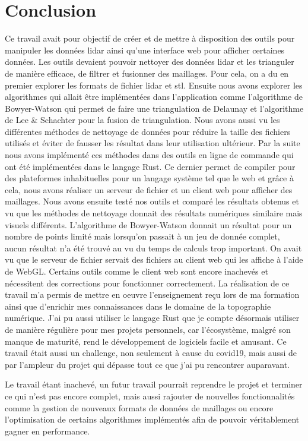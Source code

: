\chapter*{Conclusion}

Ce travail avait pour objectif de créer et de mettre à disposition des outils pour manipuler les données \gls{lidar} ainsi qu'une interface web pour afficher certaines données.
Les outils devaient pouvoir nettoyer des données \gls{lidar} et les trianguler de manière efficace, de filtrer et fusionner des maillages.
Pour cela, on a du en premier explorer les formats de fichier \gls{lidar} et
\gls{stl}.
Ensuite nous avons explorer les algorithmes qui allait être implémentées dans
l'application comme l'algorithme de Bowyer-Watson qui permet de faire une
triangulation de Delaunay et l'algorithme de Lee \& Schachter pour la fusion de
triangulation. Nous avons aussi vu les différentes méthodes de nettoyage de
données pour réduire la taille des fichiers utilisés et éviter de fausser les
résultat dans leur utilisation ultérieur. Par la suite nous avons implémenté ces
méthodes dans des outils en ligne de commande qui ont été implémentées dans le langage Rust.
Ce dernier permet de compiler pour des plateformes inhabituelles pour un langage système tel que le web et grâce à cela,
nous avons réaliser un serveur de fichier et un client web pour afficher des
maillages.
Nous avons ensuite testé nos outils et comparé les résultats obtenus et
vu que les méthodes de nettoyage donnait des résultats numériques similaire mais
visuels différents. L'algorithme de Bowyer-Watson donnait un résultat pour
un nombre de points limité mais lorsqu'on passait à un jeu de donnée complet, aucun
résultat n'a été trouvé au vu du temps de calculs trop important. 
On avait vu que le serveur de fichier servait des fichiers au client web qui les
affiche à l'aide de WebGL.
Certains outils comme le client web sont encore inachevés et nécessitent des corrections pour fonctionner correctement.
La réalisation de ce travail m'a permis de mettre en oeuvre l'enseignement reçu lors de ma formation ainsi que d'enrichir mes connaissances dans le domaine de la topographie numérique.
J'ai pu aussi utiliser le langage Rust que je compte désormais utiliser de manière régulière pour mes projets personnels, car l'écosystème, malgré son manque de maturité, rend le développement de logiciels facile et amusant.
Ce travail était aussi un challenge, non seulement à cause du covid19, mais aussi de par l'ampleur du projet qui dépasse tout ce que j'ai pu rencontrer auparavant.

Le travail étant inachevé, un futur travail pourrait reprendre le projet et
terminer ce qui n'est pas encore complet, mais aussi rajouter de nouvelles
fonctionnalités comme la gestion de nouveaux formats de données de maillages ou encore l'optimisation de certains algorithmes implémentés afin de pouvoir véritablement gagner en performance.
